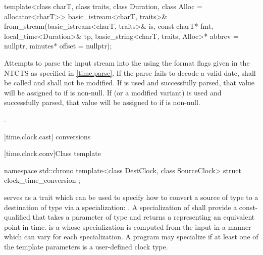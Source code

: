 %
\begin{itemdecl}
template<class charT, class traits, class Duration, class Alloc = allocator<charT>>
  basic_istream<charT, traits>&
    from_stream(basic_istream<charT, traits>& is, const charT* fmt,
                local_time<Duration>& tp, basic_string<charT, traits, Alloc>* abbrev = nullptr,
                minutes* offset = nullptr);
\end{itemdecl}

\begin{itemdescr}
\pnum
\effects
Attempts to parse the input stream 
into the   using
the format flags given in the NTCTS 
as specified in \ref{time.parse}.
If the parse fails to decode a valid date,
 shall be called
and  shall not be modified.
If  is used and successfully parsed,
that value will be assigned to  if  is non-null.
If  (or a modified variant) is used and successfully parsed,
that value will be assigned to  if  is non-null.

\pnum
\returns {}.
\end{itemdescr}

[time.clock.cast]{ conversions}

[time.clock.conv]{Class template }
%

\begin{codeblock}
namespace std::chrono {
  template<class DestClock, class SourceClock>
  struct clock_time_conversion {};
}
\end{codeblock}

\pnum
{} serves as a trait
which can be used to specify how to convert
a source  of type
to a destination  of type
via a specialization:
.
A specialization of 
shall provide a const-qualified 
that takes a parameter of type 
and returns a 
representing an equivalent point in time.
 is a 
whose specialization is computed from the input 
in a manner which can vary for each  specialization.
A program may specialize 
if at least one of the template parameters is a user-defined clock type.

